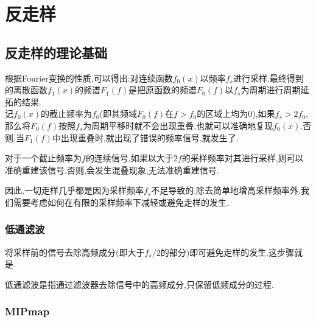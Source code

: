 \documentclass{ctexart}
\begin{document}
\section{反走样}
\subsection{反走样的理论基础}
根据Fourier变换的性质,可以得出:对连续函数$f_0(x)$以频率$f_s$进行采样,最终得到的离散函数$f_1(x)$的频谱$F_1(f)$是把原函数的频谱$F_0(f)$以$f_s$为周期进行周期延拓的结果.\\
\indent 记$f_0(x)$的截止频率为$f_0$(即其频域$F_0(f)$在$f>f_0$的区域上均为$0$),如果$f_s>2f_0$,那么将$F_0(f)$按照$f_s$为周期平移时就不会出现重叠,也就可以准确地复现$f_0(x)$.否则,当$F_1(f)$中出现重叠时,就出现了错误的频率信号,就发生了.
\begin{theorem}
    对于一个截止频率为$f$的连续信号,如果以大于$2f$的采样频率对其进行采样,则可以准确重建该信号.否则,会发生混叠现象,无法准确重建信号.
\end{theorem}
因此,一切走样几乎都是因为采样频率$f_s$不足导致的.除去简单地增高采样频率外,我们需要考虑如何在有限的采样频率下减轻或避免走样的发生.
\subsubsection{低通滤波}
将采样前的信号去除高频成分(即大于$f_s/2$的部分)即可避免走样的发生.这步骤就是.
\begin{definition}[低通滤波]
    低通滤波是指通过滤波器去除信号中的高频成分,只保留低频成分的过程.
\end{definition}
\subsubsection{MIPmap}
\end{document}

